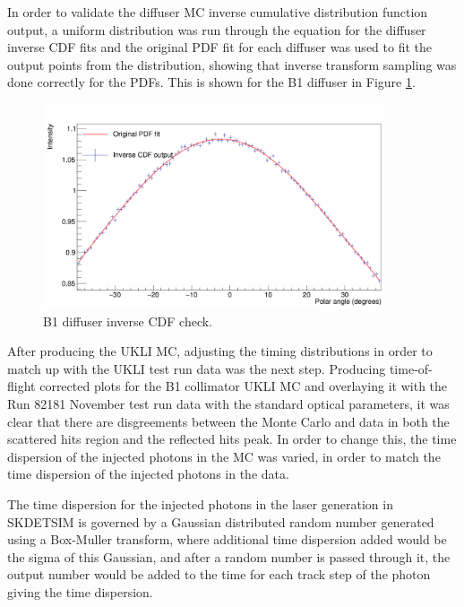 In order to validate the diffuser MC inverse cumulative distribution function output, a uniform distribution was run through the equation for the diffuser inverse CDF fits and the original PDF fit for each diffuser was used to fit the output points from the distribution, showing that inverse transform sampling was done correctly for the PDFs. This is shown for the B1 diffuser in Figure \ref{fig:inv_cdf_check}. 

\begin{figure}
    \centering
    \includegraphics[width=0.9\textwidth]{Figures/inv_cdf_check_diff_B1.PNG}
    \caption{B1 diffuser inverse CDF check.}
    \label{fig:inv_cdf_check}
\end{figure}


After producing the UKLI MC, adjusting the timing distributions in order to match up with the UKLI test run data was the next step. Producing time-of-flight corrected plots for the B1 collimator UKLI MC and overlaying it with the Run 82181 November test run data with the standard optical parameters, it was clear that there are disgreements between the Monte Carlo and data in both the scattered hits region and the reflected hits peak. In order to change this, the time dispersion of the injected photons in the MC was varied, in order to match the time dispersion of the injected photons in the data.

The time dispersion for the injected photons in the laser generation in SKDETSIM is governed by a Gaussian distributed random number generated using a Box-Muller transform, where additional time dispersion added would be the sigma of this Gaussian, and after a random number is passed through it, the output number would be added to the time for each track step of the photon giving the time dispersion.

